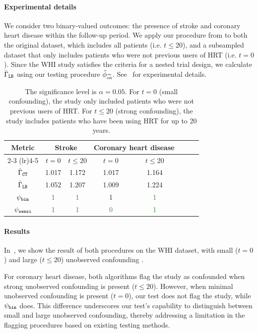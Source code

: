 \paragraph{Experimental details} We consider two binary-valued outcomes: the presence of stroke and coronary heart disease
within the follow-up period. We apply our procedure from  to both the original dataset, which includes all patients (i.e. $t \leq 20$), and a subsampled dataset that only includes patients who were not previous users of HRT (i.e. $t = 0$). Since the WHI study satisfies the criteria for a nested trial design, we calculate $\hat{\Gamma}_{\texttt{LB}}$ using our testing procedure $\hat{\phi}_{\widetilde{\mathrm{os}}}$.
See~ for experimental details.

\begin{table}
\centering
\caption{The significance level is $\alpha=0.05$. For $t=0$ (small confounding), the study only included patients who were not previous users of HRT. For $t \leq 20$ (strong confounding), the study includes patients who have been using HRT for up to 20 years.}
\label{table:whi}
\begin{tabular}{cccccccc}
\toprule
\multirow{2}{*}{Metric} & \multicolumn{2}{c}{Stroke} & \multicolumn{2}{c}{Coronary heart disease} \\
\cmidrule(lr){2-3} \cmidrule(lr){4-5}
& $t=0$ & $t\leq20$ & $t=0$ & $t \leq 20$ \\
\midrule
$\hat{\Gamma}_{\texttt{CT}}$ & 1.017 & 1.172 & 1.017 & 1.164 \\
$\hat{\Gamma}_{\texttt{LB}}$  & 1.052 & 1.207 & 1.009 & 1.224 \\
\midrule
$\psi_{\texttt{bin}}$  & \textcolor{ForestGreen}{1} & \textcolor{ForestGreen}{1} & \textcolor{BrickRed}{1} & \textcolor{ForestGreen}{1} \\
$\psi_{\texttt{sensi}}$  & \textcolor{ForestGreen}{1} & \textcolor{ForestGreen}{1} & \textcolor{ForestGreen}{0} & \textcolor{ForestGreen}{1} \\
\bottomrule
\end{tabular}
\end{table}



\paragraph{Results} In~, we show the result of both procedures on the WHI dataset, with small ($t=0$) and large ($t \leq 20$) unobserved confounding .  


For coronary heart disease, both algorithms flag the study as confounded when strong unobserved confounding is present ($t \leq 20$). However, when minimal unobserved confounding is present ($t = 0$), our test does not flag the study, while $\psi_{\texttt{bin}}$ does. This difference underscores our test's capability to distinguish between small and large unobserved confounding, thereby addressing a limitation in the flagging procedures based on existing testing methods.

